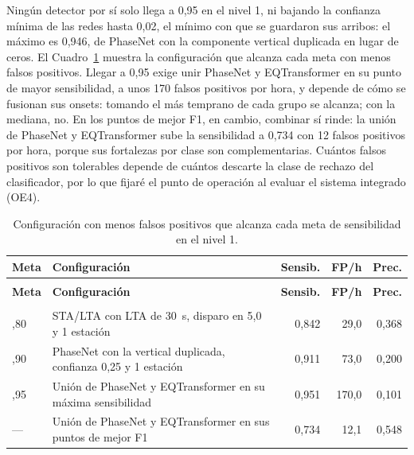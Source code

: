 \documentclass[12pt,oneside,spanish,oldfontcommands]{memoir}
\begin{document}
Ningún detector por sí solo llega a 0,95 en el nivel 1, ni bajando la
confianza mínima de las redes hasta 0,02, el mínimo con que se guardaron sus
arribos: el máximo es 0,946, de PhaseNet con la componente vertical duplicada
en lugar de ceros. El Cuadro~\ref{tab:metas} muestra la configuración que
alcanza cada meta con menos falsos positivos. Llegar a 0,95 exige unir
PhaseNet y EQTransformer en su punto de mayor sensibilidad, a unos 170 falsos
positivos por hora, y depende de cómo se fusionan sus onsets: tomando el más
temprano de cada grupo se alcanza; con la mediana, no. En los puntos de mejor
F1, en cambio, combinar sí rinde: la unión de PhaseNet y EQTransformer sube la
sensibilidad a 0,734 con 12 falsos positivos por hora, porque sus fortalezas
por clase son complementarias. Cuántos falsos positivos son tolerables
depende de cuántos descarte la clase de rechazo del clasificador, por lo que
fijaré el punto de operación al evaluar el sistema integrado (OE4).

{\small
\setlength{\tabcolsep}{4pt}
\begin{longtable}{>{\raggedright\arraybackslash}p{1.1cm}>{\raggedright\arraybackslash}p{6.6cm}rrr}
\caption{Configuración con menos falsos positivos que alcanza cada meta de sensibilidad en el nivel 1.}\label{tab:metas}\\
\toprule
\textbf{Meta} & \textbf{Configuración} & \textbf{Sensib.} & \textbf{FP/h} & \textbf{Prec.} \\
\midrule
\endfirsthead
\multicolumn{5}{l}{\itshape Cuadro \thetable{} (continuación)}\\
\toprule
\textbf{Meta} & \textbf{Configuración} & \textbf{Sensib.} & \textbf{FP/h} & \textbf{Prec.} \\
\midrule
\endhead
\midrule
\multicolumn{5}{r}{\itshape Continúa en la página siguiente}\\
\endfoot
\bottomrule
\endlastfoot
0,80 & STA/LTA con LTA de 30~s, disparo en 5,0 y 1 estación & 0,842 & 29,0 & 0,368 \\*
0,90 & PhaseNet con la vertical duplicada, confianza 0,25 y 1 estación & 0,911 & 73,0 & 0,200 \\*
0,95 & Unión de PhaseNet y EQTransformer en su máxima sensibilidad & 0,951 & 170,0 & 0,101 \\*
\midrule\nopagebreak
--- & Unión de PhaseNet y EQTransformer en sus puntos de mejor F1 & 0,734 & 12,1 & 0,548 \\
\end{longtable}
}
\end{document}
